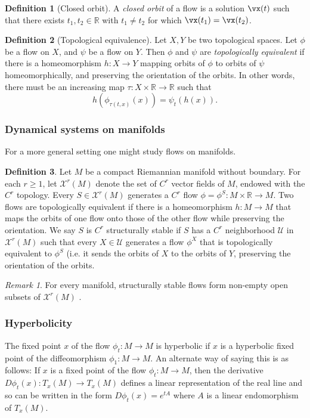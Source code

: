 \documentclass{article}
\theoremstyle{definition} \newtheorem{definition}{Definition}
\theoremstyle{remark} \newtheorem{remark}{Remark}
\newcommand{\reals}{\mathbb{R}}
\newcommand{\mcU}{\mathcal{U}}
\newcommand{\mcX}{\mathcal{X}}
\newcounter{ct}
\begin{document}
\begin{definition}[Closed orbit]
A \emph{closed orbit} of a flow is a solution $\vx(t)$ such that there exists $t_1, t_2\in\reals$ with  $t_1\neq t_2$ for which $\vx(t_1) = \vx(t_2)$.
\end{definition}

\begin{definition}[Topological equivalence]
Let $X,Y$ be two topological spaces. Let $\phi$ be a flow on $X$, and $\psi$ be a flow on $Y$.
Then $\phi$ and $\psi$ are \emph{topologically equivalent} if there is a homeomorphism $h\colon X\to Y$ mapping orbits of  $\phi$  to orbits of $\psi$  homeomorphically, and preserving the orientation of the orbits. In other words, there must be  an increasing map $\tau\colon X\times\reals\rightarrow\reals$ such that 
\begin{equation}\label{eq:topeq}
h(\phi_{\tau(t,x)}(x)) = \psi_t(h(x)).
\end{equation}
\end{definition}


\subsubsection{Dynamical systems on manifolds}
For a more general setting one might study flows on manifolds.
\begin{definition}
Let $M$ be a compact Riemannian manifold without boundary. For each $r\geq 1$, let $\mcX^r(M)$ denote the set of $C^r$ vector fields of $M$, endowed with the $C^r$ topology. Every $S\in \mcX^r(M)$ generates a $C^r$ flow $\phi=\phi^S\colon M\times \reals\rightarrow M$.
Two flows are topologically equivalent if there is a homeomorphism $h\colon M\rightarrow M$ that maps the orbits of one flow onto those of the other flow while preserving the orientation. 
 We say $S$ is $C^r$ structurally stable if $S$ has a $C^r$ neighborhood $\mcU$ in $\mcX^r(M)$ such that every $X \in \mcU$ generates a flow $\phi^X$ that is topologically equivalent to $\phi^S$ (i.e. it sends the orbits of $X$ to the orbits of $Y$, preserving the orientation of the orbits.
\end{definition}

\begin{remark}
For every manifold, structurally stable flows form non-empty open subsets of $\mcX^r(M)$ \citep{palis1970ss}.
\end{remark}

\subsubsection{Hyperbolicity}
The fixed point $x$ of the flow $\phi_t\colon M\rightarrow M$ is hyperbolic if $x$ is a hyperbolic fixed point of the diffeomorphism $\phi_1: M\rightarrow M$.
 An alternate way of saying this is as follows: If $x$ is a fixed point of the flow $\phi_t\colon M\rightarrow M$, then the derivative $D\phi_t(x)\colon T_x(M)\rightarrow T_x(M)$ defines a linear representation of the real line and so can be written in the form $D\phi_t(x)=e^{tA}$ where $A$ is a linear endomorphism of $T_x(M)$.
\end{document}
